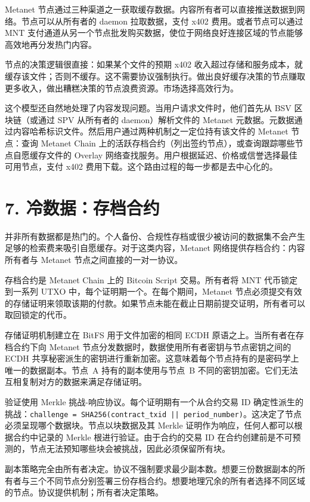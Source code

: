 \documentclass[11pt,a4paper]{article}
\begin{document}
Metanet 节点通过三种渠道之一获取缓存数据。内容所有者可以直接推送数据到网络。节点可以从所有者的 daemon 拉取数据，支付 x402 费用。或者节点可以通过 MNT 支付通道从另一个节点批发购买数据，使位于网络良好连接区域的节点能够高效地再分发热门内容。

节点的决策逻辑很直接：如果某个文件的预期 x402 收入超过存储和服务成本，就缓存该文件；否则不缓存。这不需要协议强制执行。做出良好缓存决策的节点赚取更多收入，做出糟糕决策的节点浪费资源。市场选择高效行为。

这个模型还自然地处理了内容发现问题。当用户请求文件时，他们首先从 BSV 区块链（或通过 SPV 从所有者的 daemon）解析文件的 Metanet 元数据。元数据通过内容哈希标识文件。然后用户通过两种机制之一定位持有该文件的 Metanet 节点：查询 Metanet Chain 上的活跃存档合约（列出签约节点），或查询跟踪哪些节点自愿缓存文件的 Overlay 网络查找服务。用户根据延迟、价格或信誉选择最佳可用节点，支付 x402 费用下载。这个路由过程的每一步都是去中心化的。

\section{7. 冷数据：存档合约}

并非所有数据都是热门的。个人备份、合规性存档或很少被访问的数据集不会产生足够的检索费来吸引自愿缓存。对于这类内容，Metanet 网络提供存档合约：内容所有者与 Metanet 节点之间直接的一对一协议。

存档合约是 Metanet Chain 上的 Bitcoin Script 交易。所有者将 MNT 代币锁定到一系列 UTXO 中，每个证明期一个。在每个期间，Metanet 节点必须提交有效的存储证明来领取该期的付款。如果节点未能在截止日期前提交证明，所有者可以取回锁定的代币。

存储证明机制建立在 BitFS 用于文件加密的相同 ECDH 原语之上。当所有者在存档合约下向 Metanet 节点分发数据时，数据使用所有者密钥与节点密钥之间的 ECDH 共享秘密派生的密钥进行重新加密。这意味着每个节点持有的是密码学上唯一的数据副本。节点~A 持有的副本使用与节点~B 不同的密钥加密。它们无法互相复制对方的数据来满足存储证明。

验证使用 Merkle 挑战-响应协议。每个证明期有一个从合约交易 ID 确定性派生的挑战：\texttt{challenge = SHA256(contract\_txid || period\_number)}。这决定了节点必须呈现哪个数据块。节点以块数据及其 Merkle 证明作为响应，任何人都可以根据合约中记录的 Merkle 根进行验证。由于合约的交易 ID 在合约创建前是不可预测的，节点无法预知哪些块会被挑战，因此必须保留所有块。

副本策略完全由所有者决定。协议不强制要求最少副本数。想要三份数据副本的所有者与三个不同节点分别签署三份存档合约。想要地理冗余的所有者选择不同区域的节点。协议提供机制；所有者决定策略。
\end{document}
